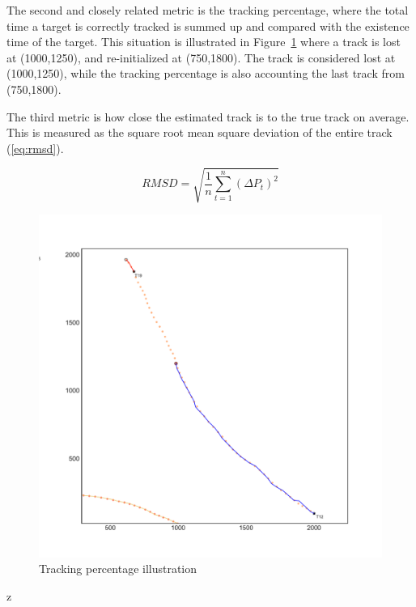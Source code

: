 The second and closely related metric is the tracking percentage, where the total time a target is correctly tracked is summed up and compared with the existence time of the target. This situation is illustrated in Figure~\ref{fig:track_percentage} where a track is lost at (1000,1250), and re-initialized at (750,1800). The track is considered lost at (1000,1250), while the tracking percentage is also accounting the last track from (750,1800). 

The third metric is how close the estimated track is to the true track on average. This is measured as the square root mean square deviation of the entire track (\ref{eq:rmsd}).

\begin{equation}\label{eq:rmsd}
RMSD = \sqrt{\frac{1}{n}\sum_{t=1}^{n}{(\Delta P_t)}^2}
\end{equation}
\begin{figure}
\centering
\includegraphics[width = .8\textwidth]{Figures/track_percentage_illustration.pdf}
\caption{Tracking percentage illustration}\label{fig:track_percentage}
\end{figure}z

